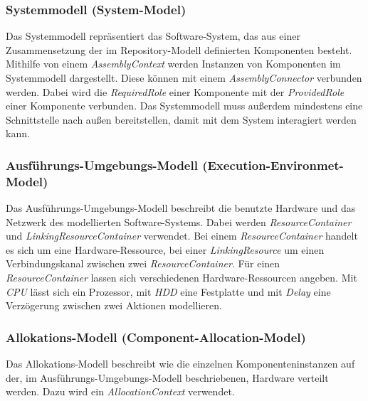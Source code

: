 \subsubsection{Systemmodell (System-Model)}
Das Systemmodell repräsentiert das Software-System, das aus einer Zusammensetzung der im Repository-Modell definierten Komponenten besteht. Mithilfe von einem \emph{AssemblyContext} werden Instanzen von Komponenten im Systemmodell dargestellt. Diese können mit einem \emph{AssemblyConnector} verbunden werden. Dabei wird die \emph{RequiredRole} einer Komponente mit der \emph{ProvidedRole} einer Komponente verbunden. Das Systemmodell muss außerdem mindestens eine Schnittstelle nach außen bereitstellen, damit mit dem System interagiert werden kann. 
\subsubsection{Ausführungs-Umgebungs-Modell (Execution-Environmet-Model)}
Das Ausführungs-Umgebungs-Modell beschreibt die benutzte Hardware und das Netzwerk des modellierten Software-Systems. Dabei werden \emph{ResourceContainer} und \emph{LinkingResourceContainer} verwendet. Bei einem \emph{ResourceContainer} handelt es sich um eine Hardware-Ressource, bei einer \emph{LinkingResource} um einen Verbindungskanal zwischen zwei \emph{ResourceContainer}. Für einen \emph{ResourceContainer} lassen sich verschiedenen Hardware-Ressourcen angeben. Mit \emph{CPU} lässt sich ein Prozessor, mit \emph{HDD} eine Festplatte und mit \emph{Delay} eine Verzögerung zwischen zwei Aktionen modellieren.
\subsubsection{Allokations-Modell (Component-Allocation-Model)}
Das Allokations-Modell beschreibt wie die einzelnen Komponenteninstanzen auf der, im Ausführungs-Umgebungs-Modell beschriebenen, Hardware verteilt werden. Dazu wird ein \emph{AllocationContext} verwendet. 

